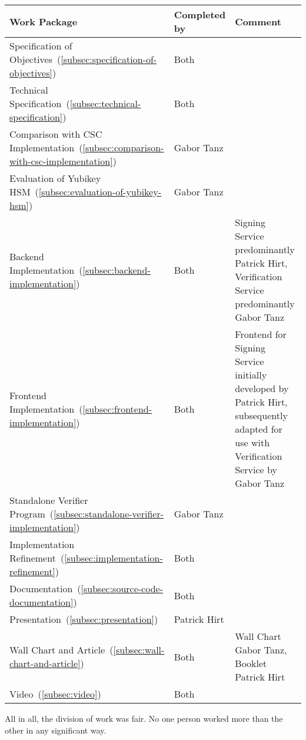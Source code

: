 \begin{center}
    \begin{longtable}{p{5.35cm}|p{2.2cm}|p{7.0cm}}
        \textbf{Work Package} & \textbf{Completed by} & \textbf{Comment}
        \\
        \hline
        Specification of Objectives~(\ref{subsec:specification-of-objectives})
        & Both
        &
        \\
        \hline
        Technical Specification~(\ref{subsec:technical-specification})
        & Both
        &
        \\
        \hline
        Comparison with CSC Implementation~(\ref{subsec:comparison-with-csc-implementation})
        & Gabor Tanz
        &
        \\
        \hline
        Evaluation of Yubikey HSM~(\ref{subsec:evaluation-of-yubikey-hsm})
        & Gabor Tanz
        &
        \\
        \hline
        Backend Implementation~(\ref{subsec:backend-implementation})
        & Both
        & Signing Service predominantly Patrick Hirt, Verification Service predominantly Gabor Tanz
        \\
        \hline
        Frontend Implementation~(\ref{subsec:frontend-implementation})
        & Both
        & Frontend for Signing Service initially developed by Patrick Hirt, subsequently adapted for use with Verification Service by Gabor Tanz
        \\
        \hline
        Standalone Verifier Program~(\ref{subsec:standalone-verifier-implementation})
        & Gabor Tanz
        &
        \\
        \hline
        Implementation Refinement~(\ref{subsec:implementation-refinement})
        & Both
        &
        \\
        \hline
        Documentation~(\ref{subsec:source-code-documentation})
        & Both
        &
        \\
        \hline
        Presentation~(\ref{subsec:presentation})
        & Patrick Hirt
        &
        \\
        \hline
        Wall Chart and Article~(\ref{subsec:wall-chart-and-article})
        & Both
        & Wall Chart Gabor Tanz, Booklet Patrick Hirt
        \\
        \hline
        Video~(\ref{subsec:video})
        & Both
        &
        \\
        \hline
    \end{longtable}
\end{center}

All in all, the division of work was fair.
No one person worked more than the other in any significant way.



